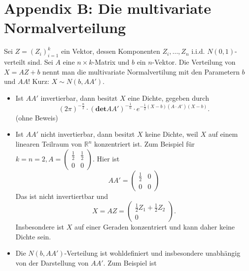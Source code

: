 \documentclass[10pt]{article}
\newcommand{\IR}{\mathbb{R}} %
\begin{document}
			
			
			
			\newpage
			\part{Appendix B: Die multivariate Normalverteilung}
			\begin{Definition}
				Sei $Z = (Z_i)^k_{i=1}$ ein Vektor, dessen Komponenten $Z_i, \ldots, Z_n$ i.i.d. $N(0,1)$-verteilt sind. Sei $A$ eine $n \times k$-Matrix und $b$ ein $n$-Vektor. Die Verteilung von $X = AZ+b$ nennt man die multivariate Normalvertilung mit den Parametern $b$ und $AA$! Kurz: $X \sim N(b,AA')$.
			\end{Definition}
			\begin{Bemerkung}
				\begin{itemize}
					\item Ist $AA'$ invertierbar, dann besitzt $X$ eine Dichte, gegeben durch 
					\begin{equation*}
						(2 \pi)^{-\frac{n}{2}} \cdot(\textbf{det}AA')^{-\frac{1}{n}} \cdot e ^{- \frac{1}{2} (X-b)(A\cdot A')(X-b)}.
					\end{equation*}
					(ohne Beweis)
					\item Ist $AA'$ nicht invertierbar, dann besitzt $X$ keine Dichte, weil $X$ auf einem linearen Teilraum von $\IR^n$ konzentriert ist. Zum Beispiel für $k=n=2, A=\begin{pmatrix}
						\frac{1}{2} & \frac{1}{2}\\
						0 &  0 
					\end{pmatrix}$. Hier ist 
					\begin{equation*}
						AA' = \begin{pmatrix}
							\frac{1}{2} & 0 \\ 0&0
						\end{pmatrix}
					\end{equation*}
					Das ist nicht invertiertbar und 
					\begin{equation*}
						X = AZ = \begin{pmatrix}
							\frac{1}{2} Z_1 + \frac{1}{2}Z_2\\
							0
						\end{pmatrix}.
					\end{equation*}
					Insbesondere ist $X$ auf einer Geraden konzentriert und kann daher keine Dichte sein. 
					\item Die $N(b,AA')$-Verteilung ist wohldefiniert und insbesondere unabhängig von der Darstellung von $AA'$. Zum Beispiel ist 

\end{itemize}
\end{Bemerkung}
\end{document}
